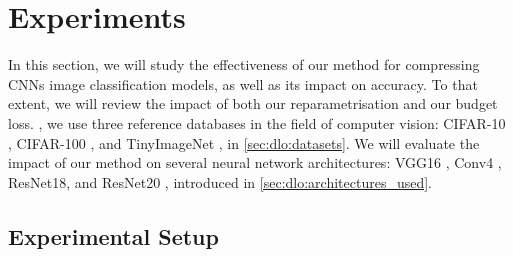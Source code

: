 
\section{Experiments}\label{sec:chap1:experiments}

In this section, we will study the effectiveness of our method for compressing
\aclp{CNN} image classification models, as well as its impact on accuracy. To
that extent, we will review the impact of both our reparametrisation and our
budget loss. \DIFdelbegin {}\DIFdelend \DIFaddbegin {}\DIFaddend , we use three reference databases in the field of
computer vision: CIFAR-10 \cite{CIFARdataset}, CIFAR-100 \cite{CIFARdataset},
and TinyImageNet \cite{TinyImageNet}, \DIFdelbegin {}\DIFdelend \DIFaddbegin {}\DIFaddend in \cref{sec:dlo:datasets}. We
will evaluate the impact of our method on several neural network architectures:
VGG16 \cite{DBLP:journals/corr/SimonyanZ14a}, Conv4
\cite{DBLP:conf/iclr/FrankleC19}, ResNet18, and ResNet20
\cite{DBLP:conf/cvpr/HeZRS16}, introduced in
\cref{sec:dlo:architectures_used}.\\


\subsection{Experimental Setup}\label{sec:chap1:experimental_setup}

